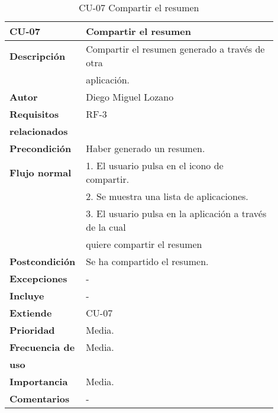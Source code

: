 \begin{longtable}{>{\raggedright}b{0.2\linewidth}>{\raggedright\arraybackslash}b{0.7\linewidth}}
	\toprule
	\textbf{CU-07} & \textbf{Compartir el resumen} \\
	\toprule
	\endhead
	
	\toprule
	\caption{CU-07 Compartir el resumen}
	\endfoot
	
	\small{\textbf{Descripción}} & Compartir el resumen generado a través de otra \\
	& aplicación. \\
	\small{\textbf{Autor}} & Diego Miguel Lozano \\
	\small{\textbf{Requisitos}} & RF-3  \\
	\small{\textbf{relacionados}} & \\
	\small{\textbf{Precondición}} & Haber generado un resumen. \\
	\small{\textbf{Flujo normal}} & \quad \small{1. El usuario pulsa en el icono de compartir.} \\
	& \quad \small{2. Se muestra una lista de aplicaciones.} \\
	& \quad \small{3. El usuario pulsa en la aplicación a través de la cual} \\
	& \qquad \small{quiere compartir el resumen} \\
	\small{\textbf{Postcondición}} & Se ha compartido el resumen. \\
	\small{\textbf{Excepciones}} & - \\
	\small{\textbf{Incluye}} & - \\
	\small{\textbf{Extiende}} & CU-07 \\
	\small{\textbf{Prioridad}} & Media. \\
	\small{\textbf{Frecuencia de}} & Media. \\
	\small{\textbf{uso}} & \\
	\small{\textbf{Importancia}} & Media. \\
	\small{\textbf{Comentarios}} & - \\
\end{longtable}


